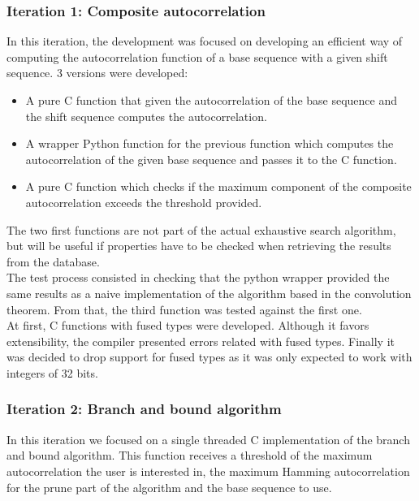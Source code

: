      \subsubsection{Iteration 1: Composite autocorrelation}

      In this iteration, the development was focused on developing an efficient
      way of computing the autocorrelation function of a base sequence with a
      given shift sequence. 3 versions were developed:
      \begin{itemize}
        \item A pure C function that given the autocorrelation of the base
        sequence and the shift sequence computes the autocorrelation.
        \item A wrapper Python function for the previous function which
        computes the autocorrelation of the given base sequence and passes it
        to the C function.
        \item A pure C function which checks if the maximum component of the
        composite autocorrelation exceeds the threshold provided.
      \end{itemize}

      The two first functions are not  part of the actual exhaustive search
      algorithm, but will be useful if properties have to be checked when retrieving the results from the database. \\

      The test process consisted in checking that the python wrapper provided
      the same results as a naive implementation of the algorithm based in
      the convolution theorem. From that, the third function was tested against the
      first one.\\

      At first, C functions with fused types were developed. Although it
      favors extensibility, the compiler presented errors related with
      fused types. Finally  it was decided to drop support for fused types
      as it was only expected to work with integers of 32 bits.\\

      \subsubsection{Iteration 2: Branch and bound algorithm}

      In this iteration we focused on a single threaded C implementation of the
      branch and bound algorithm. This function receives a threshold of the
      maximum autocorrelation the user is interested in, the maximum Hamming
      autocorrelation for the prune part of the algorithm and the base sequence
      to use.\\

